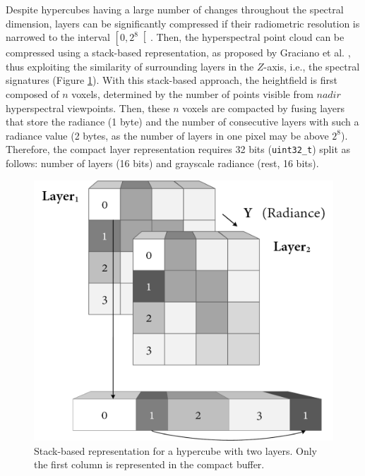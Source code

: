 Despite hypercubes having a large number of changes throughout the spectral dimension, layers can be significantly compressed if their radiometric resolution is narrowed to the interval $\left[0, 2^8\right[$. Then, the hyperspectral point cloud can be compressed using a stack-based representation, as proposed by Graciano et al. \cite{graciano_quadstack_2021}, thus exploiting the similarity of surrounding layers in the $Z$-axis, i.e., the spectral signatures (Figure \ref{fig:hyper_compression_stack}). With this stack-based approach, the heightfield is first composed of $n$ voxels, determined by the number of points visible from $\textit{nadir}$ hyperspectral viewpoints. Then, these $n$ voxels are compacted by fusing layers that store the radiance (1 byte) and the number of consecutive layers with such a radiance value (2 bytes, as the number of layers in one pixel may be above $2^8$). Therefore, the compact layer representation requires 32 bits (\verb|uint32_t|) split as follows: number of layers (16 bits) and grayscale radiance (rest, 16 bits).

\begin{figure}[ht]
    \centering
    \includegraphics[width=.65\linewidth]{figs/hyper_point_cloud/stack.png}
	\caption{Stack-based representation for a hypercube with two layers. Only the first column is represented in the compact buffer. }
	\label{fig:hyper_compression_stack}
\end{figure}


